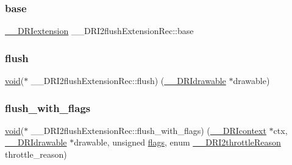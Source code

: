 \subsubsection{\texorpdfstring{base}{base}}
{\footnotesize\ttfamily \hyperlink{dri__interface_8h_a4e0a61c8ece00d2b2c6792a9a1b55385}{\+\_\+\+\_\+\+D\+R\+Iextension} \+\_\+\+\_\+\+D\+R\+I2flush\+Extension\+Rec\+::base}

\mbox{\label{struct_____d_r_i2flush_extension_rec_abbfae72393667f239298420f80b98093}} 
\subsubsection{\texorpdfstring{flush}{flush}}
{\footnotesize\ttfamily \hyperlink{_s_d_l__opengles2__gl2ext_8h_ae5d8fa23ad07c48bb609509eae494c95}{void}($\ast$ \+\_\+\+\_\+\+D\+R\+I2flush\+Extension\+Rec\+::flush) (\hyperlink{dri__interface_8h_a5bfb832a0a08208d95b3bbef439d2262}{\+\_\+\+\_\+\+D\+R\+Idrawable} $\ast$drawable)}

\mbox{\label{struct_____d_r_i2flush_extension_rec_a4c6591bd6fa19715fbfbe59d49cf3f17}} 
\subsubsection{\texorpdfstring{flush\+\_\+with\+\_\+flags}{flush\_with\_flags}}
{\footnotesize\ttfamily \hyperlink{_s_d_l__opengles2__gl2ext_8h_ae5d8fa23ad07c48bb609509eae494c95}{void}($\ast$ \+\_\+\+\_\+\+D\+R\+I2flush\+Extension\+Rec\+::flush\+\_\+with\+\_\+flags) (\hyperlink{dri__interface_8h_a3fd295cba82b5a3d79f1ee7e12bfb908}{\+\_\+\+\_\+\+D\+R\+Icontext} $\ast$ctx, \hyperlink{dri__interface_8h_a5bfb832a0a08208d95b3bbef439d2262}{\+\_\+\+\_\+\+D\+R\+Idrawable} $\ast$drawable, unsigned \hyperlink{glcorearb_8h_ac7ba7d3cce3d19ca020e056b37231289}{flags}, enum \hyperlink{dri__interface_8h_a195f4ef9181a99d4aae51c5ba5ee32aa}{\+\_\+\+\_\+\+D\+R\+I2throttle\+Reason} throttle\+\_\+reason)}

